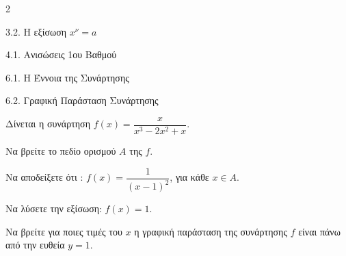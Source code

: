 \begin{ylh}{2}
    \item 3.2. Η εξίσωση $x^{\nu}=a$
    \item 4.1. Ανισώσεις 1ου Βαθμού
    \item 6.1. Η Έννοια της Συνάρτησης
    \item 6.2. Γραφική Παράσταση Συνάρτησης
\end{ylh}
Δίνεται η συνάρτηση $f(x) = \dfrac{x}{x^3-2x^2+x}$.

\begin{alist}
\item Να βρείτε το πεδίο ορισμού $A$ της $f$. 
\item Να αποδείξετε ότι : $f(x) = \dfrac{1}{(x-1)^2}$, για κάθε $x \in A$.
\item Να λύσετε την εξίσωση: $f(x) = 1$.
\item Να βρείτε για ποιες τιμές του $x$ η γραφική παράσταση της συνάρτησης $f$ είναι πάνω από την ευθεία $y = 1$.
\end{alist}

